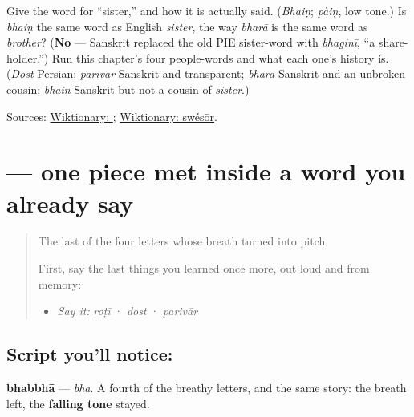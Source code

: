 \begin{tcolorbox}[breakable,colback=teal!4,colframe=teal!35!black,title={Before you move on}]
Give the word for \textquotedblleft{}sister,\textquotedblright{} and how it is actually said. (\emph{Bhaiṇ}; \emph{pàiṇ}, low tone.) Is \emph{bhaiṇ} the same word as English \emph{sister}, the way \emph{bharā} is the same word as \emph{brother}? (\textbf{No} — Sanskrit replaced the old PIE sister-word with \emph{bhaginī}, \textquotedblleft{}a share-holder.\textquotedblright{}) Run this chapter's four people-words and what each one's history is. (\emph{Dost} Persian; \emph{parivār} Sanskrit and transparent; \emph{bharā} Sanskrit and an unbroken cousin; \emph{bhaiṇ} Sanskrit but not a cousin of \emph{sister}.)

Sources: \href{https://en.wiktionary.org/wiki/\%E0\%A8\%AD\%E0\%A9\%88\%E0\%A8\%A3}{Wiktionary: }; \href{https://en.wiktionary.org/wiki/Reconstruction:Proto-Indo-European/sw\%C3\%A9s\%C5\%8Dr}{Wiktionary: swésōr}.
\end{tcolorbox}
\section[\texorpdfstring{\pa{ਭ} (bha)}{ਭ (bha)}]{ — one piece met inside a word you already say}

\label{lesson:PA-S11-bhabbha}



\begin{quote}
The last of the four letters whose breath turned into pitch.

First, say the last things you learned once more, out loud and from memory:

\begin{itemize}
\raggedright
  \item \emph{Say it:} \emph{roṭī} · \emph{dost} · \emph{parivār}
\end{itemize}
\end{quote}

\subsection*{Script you'll notice: }
\begin{quote}
\end{quote}

\textbf{bhabbhā} — \emph{bha}. A fourth of the breathy letters, and the same story: the breath left, the \textbf{falling tone} stayed.

